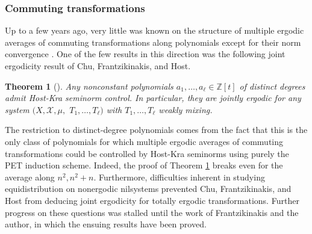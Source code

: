 \documentclass[11pt]{amsart}
\newtheorem{theorem}[lemma]{Theorem}
\theoremstyle{definition}
\newcommand{\Z}{{\mathbb Z}}
\newcommand{\CX}{{\mathcal X}}
\newcommand{\1}{{\mathbf{1}}}
\begin{document}
\subsubsection{Commuting transformations}

Up to a few years ago, very little was known on the structure of multiple ergodic averages of commuting transformations along polynomials except for their norm convergence \cite{W12}. One of the few results in this direction was the following joint ergodicity result 
of Chu, Frantzikinakis, and Host. %
\begin{theorem}%
[{\cite[Theorem 1.2]{CFH11}}]\label{T: CFH distinct degrees}
    Any nonconstant polynomials $a_1, \ldots, a_\ell\in\Z[t]$ of distinct degrees admit Host-Kra seminorm control. In particular, they are jointly ergodic for any system $(X, \CX, \mu,$\! $T_1, \ldots, T_\ell)$ with $T_1, \ldots, T_\ell$ weakly mixing.
\end{theorem}
The restriction to distinct-degree polynomials comes from the fact that this is the only class of polynomials for which multiple ergodic averages of commuting transformations could be controlled by Host-Kra seminorms using purely the PET induction scheme. Indeed, the proof of Theorem \ref{T: CFH distinct degrees} breaks even for the average along $n^2, n^2+n$. Furthermore, difficulties inherent in studying equidistribution on nonergodic nilsystems prevented Chu, Frantzikinakis, and Host from deducing joint ergodicity for totally ergodic transformations.
Further progress on these questions was stalled until the work of Frantzikinakis and the author, in which the ensuing results have been proved.
\end{document}
